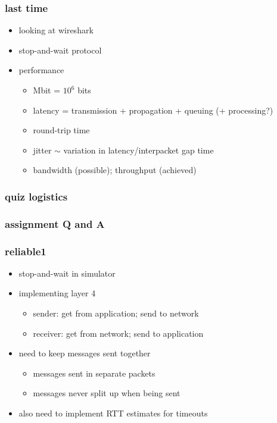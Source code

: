 \date{}
\title{}
\date{}
\usepackage{pgfplots}
\pgfplotsset{compat=1.16}

\begin{frame}
    \titlepage
\end{frame}

\begin{frame}\frametitle{last time}
    \begin{itemize}
    \item looking at wireshark
    \item stop-and-wait protocol
    \item performance
        \begin{itemize}
        \item Mbit = $10^6$ bits
        \item latency = transmission + propagation + queuing (+ processing?)
        \item round-trip time
        \item jitter $\sim$ variation in latency/interpacket gap time
        \item bandwidth (possible); throughput (achieved)
        \end{itemize}
    \end{itemize}
\end{frame}

\begin{frame}\frametitle{quiz logistics}
\end{frame}

\begin{frame}\frametitle{assignment Q and A}
\end{frame}

\begin{frame}\frametitle{reliable1}
    \begin{itemize}
    \item stop-and-wait in simulator
    \item implementing layer 4
        \begin{itemize}
        \item sender: get from application; send to network
        \item receiver: get from network; send to application
        \end{itemize}
    \item need to keep messages sent together
        \begin{itemize}
        \item messages sent in separate packets
        \item messages never split up when being sent
        \end{itemize}
    \item also need to implement RTT estimates for timeouts
    \end{itemize}
\end{frame}

